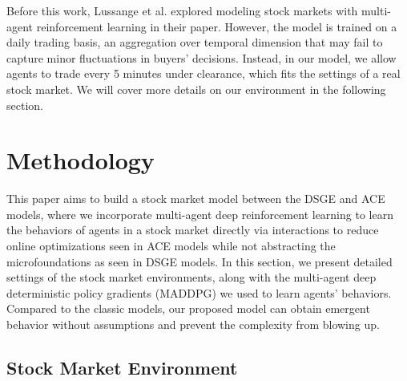 \documentclass{article}
\begin{document}
Before this work, Lussange et al. \citep{lussange2021modelling} explored modeling stock markets with multi-agent reinforcement learning in their paper. However, the model is trained on a daily trading basis, an aggregation over temporal dimension that may fail to capture minor fluctuations in buyers' decisions. Instead, in our model, we allow agents to trade every 5 minutes under clearance, which fits the settings of a real stock market. We will cover more details on our environment in the following section.

\section{Methodology}
This paper aims to build a stock market model between the DSGE and ACE models, where we incorporate multi-agent deep reinforcement learning to learn the behaviors of agents in a stock market directly via interactions to reduce online optimizations seen in ACE models while not abstracting the microfoundations as seen in DSGE models. In this section, we present detailed settings of the stock market environments, along with the multi-agent deep deterministic policy gradients (MADDPG) we used to learn agents' behaviors. Compared to the classic models, our proposed model can obtain emergent behavior without assumptions and prevent the complexity from blowing up.

\subsection{Stock Market Environment}
\end{document}

